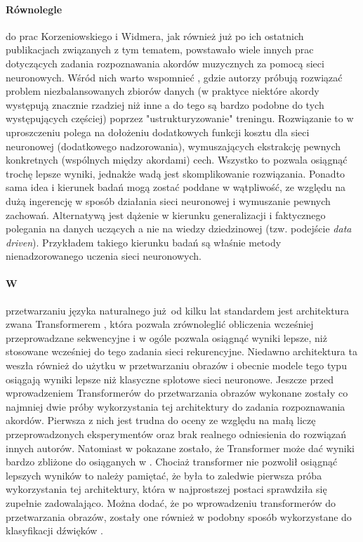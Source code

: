 \paragraph{Równolegle} do prac Korzeniowskiego i Widmera, jak również już po ich ostatnich publikacjach związanych z tym tematem, powstawało wiele innych prac dotyczących zadania rozpoznawania akordów muzycznych za pomocą sieci neuronowych. Wśród nich warto wspomnieć \cite{mcfee_structured_2017}, gdzie autorzy próbują rozwiązać problem niezbalansowanych zbiorów danych (w praktyce niektóre akordy występują znacznie rzadziej niż inne a do tego są bardzo podobne do tych występujących częściej) poprzez "ustrukturyzowanie" treningu. Rozwiązanie to w uproszczeniu polega na dołożeniu dodatkowych funkcji kosztu dla sieci neuronowej (dodatkowego nadzorowania), wymuszających ekstrakcję pewnych konkretnych (wspólnych między akordami) cech. Wszystko to pozwala osiągnąć trochę lepsze wyniki, jednakże wadą jest skomplikowanie rozwiązania. Ponadto sama idea i kierunek badań mogą zostać poddane w wątpliwość, ze względu na dużą ingerencję w sposób działania sieci neuronowej i wymuszanie pewnych zachowań. Alternatywą jest dążenie w kierunku generalizacji i faktycznego polegania na danych uczących a nie na wiedzy dziedzinowej (tzw. podejście \emph{data driven}). Przykładem takiego kierunku badań są właśnie metody nienadzorowanego uczenia sieci neuronowych.

\paragraph{W} przetwarzaniu języka naturalnego już od kilku lat standardem jest architektura zwana Transformerem \cite{vaswani_attention_2017}, która pozwala zrównoleglić obliczenia wcześniej przeprowadzane sekwencyjne i w ogóle pozwala osiągnąć wyniki lepsze, niż stosowane wcześniej do tego zadania sieci rekurencyjne. Niedawno architektura ta weszła również do użytku w przetwarzaniu obrazów \cite{dosovitskiy_image_2021} i obecnie modele tego typu osiągają wyniki lepsze niż klasyczne splotowe sieci neuronowe. Jeszcze przed wprowadzeniem Transformerów do przetwarzania obrazów wykonane zostały co najmniej dwie próby wykorzystania tej architektury do zadania rozpoznawania akordów. Pierwsza z nich \cite{chen_harmony_2019} jest trudna do oceny ze względu na małą liczę przeprowadzonych eksperymentów oraz brak realnego odniesienia do rozwiązań innych autorów. Natomiast w \cite{park_bi-directional_2019} pokazane zostało, że Transformer może dać wyniki bardzo zbliżone do osiąganych w \cite{korzeniowski_fully_2016}. Chociaż transformer nie pozwolił osiągnąć lepszych wyników to należy pamiętać, że była to zaledwie pierwsza próba wykorzystania tej architektury, która w najprostszej postaci sprawdziła się zupełnie zadowalająco. Można dodać, że po wprowadzeniu transformerów do przetwarzania obrazów, zostały one również w podobny sposób wykorzystane do klasyfikacji dźwięków \cite{gong_ast_2021}.

